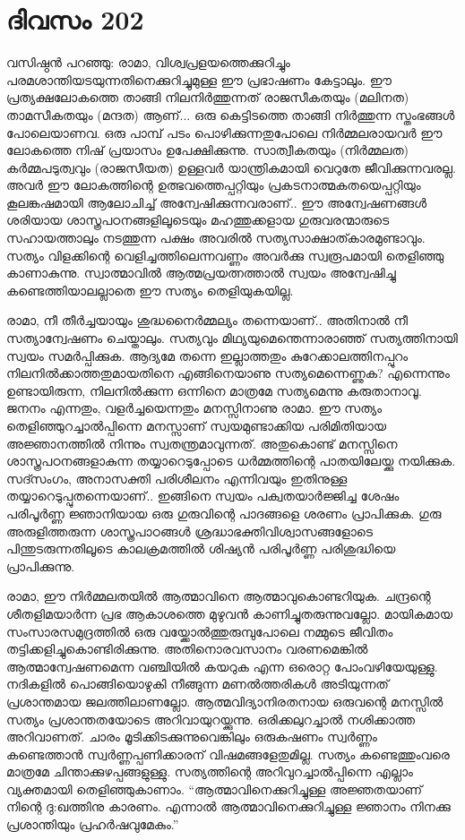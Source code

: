 \section{ദിവസം 202}


വസിഷ്ഠൻ പറഞ്ഞു: രാമാ, വിശ്വപ്രളയത്തെക്കുറിച്ചും പരമശാന്തിയടയുന്നതിനെക്കുറിച്ചുമുള്ള ഈ പ്രഭാഷണം കേട്ടാലും. ഈ പ്രത്യക്ഷലോകത്തെ താങ്ങി നിലനിർത്തുന്നത് രാജസീകതയും (മലിനത) താമസീകതയും (മന്ദത) ആണ്‌...  ഒരു കെട്ടിടത്തെ താങ്ങി നിർത്തുന്ന സ്തംഭങ്ങൾ പോലെയാണവ. ഒരു പാമ്പ് പടം പൊഴിക്കുന്നതുപോലെ നിർമ്മലരായവർ ഈ ലോകത്തെ നിഷ് പ്രയാസം  ഉപേക്ഷിക്കുന്നു. സാത്വീകതയും (നിർമ്മലത) കർമ്മപടുത്വവും (രാജസീയത) ഉള്ളവർ യാന്ത്രികമായി വെറുതേ ജീവിക്കുന്നവരല്ല. അവർ ഈ ലോകത്തിന്റെ ഉത്ഭവത്തെപ്പറ്റിയും പ്രകടനാത്മകതയെപ്പറ്റിയും കൂലങ്കഷമായി ആലോചിച്ച് അന്വേഷിക്കുന്നവരാണ്‌..  ഈ അന്വേഷണങ്ങൾ ശരിയായ ശാസ്ത്രപഠനങ്ങളിലൂടെയും മഹത്തുക്കളായ ഗുരുവരന്മാരുടെ സഹായത്താലും നടത്തുന്ന പക്ഷം അവരിൽ സത്യസാക്ഷാത്കാരമുണ്ടാവും. സത്യം വിളക്കിന്റെ വെളിച്ചത്തിലെന്നവണ്ണം അവർക്കു സ്വരൂപമായി തെളിഞ്ഞു കാണാകുന്നു. സ്വാത്മാവിൽ ആത്മപ്രയത്നത്താൽ സ്വയം അന്വേഷിച്ചു കണ്ടെത്തിയാലല്ലാതെ ഈ സത്യം തെളിയുകയില്ല.

രാമാ, നീ തീർച്ചയായും ശുദ്ധനൈർമ്മല്യം തന്നെയാണ്‌..  അതിനാൽ നീ സത്യാന്വേഷണം ചെയ്താലും. സത്യവും മിഥ്യയുമെന്തെന്നാരാഞ്ഞ് സത്യത്തിനായി സ്വയം സമർപ്പിക്കുക. ആദ്യമേ തന്നെ ഇല്ലാത്തതും കുറേക്കാലത്തിനപ്പുറം നിലനിൽക്കാത്തതുമായതിനെ എങ്ങിനെയാണു സത്യമെന്നെണ്ണുക? എന്നെന്നും ഉണ്ടായിരുന്ന, നിലനില്‍ക്കുന്ന ഒന്നിനെ മാത്രമേ സത്യമെന്നു കരുതാനാവൂ. ജനനം എന്നതും, വളർച്ചയെന്നതും മനസ്സിനാണു രാമാ. ഈ സത്യം തെളിഞ്ഞുറച്ചാല്‍പ്പിന്നെ മനസ്സാണ്‌ സ്വയമുണ്ടാക്കിയ പരിമിതിയായ അജ്ഞാനത്തിൽ നിന്നും സ്വതന്ത്രമാവുന്നത്. അതുകൊണ്ട് മനസ്സിനെ ശാസ്ത്രപഠനങ്ങളാകുന്ന തയ്യാറെടുപ്പോടെ  ധർമ്മത്തിന്റെ പാതയിലേയ്ക്കു നയിക്കുക. സദ്സംഗം, അനാസക്തി പരിശീലനം എന്നിവയും ഇതിനുള്ള തയ്യാറെടുപ്പുതന്നെയാണ്‌..  ഇങ്ങിനെ സ്വയം പക്വതയാർജ്ജിച്ച ശേഷം പരിപൂർണ്ണ ജ്ഞാനിയായ ഒരു ഗുരുവിന്റെ പാദങ്ങളെ ശരണം പ്രാപിക്കുക. ഗുരു അരുളിത്തരുന്ന ശാസ്ത്രപാഠങ്ങൾ ശ്രദ്ധാഭക്തിവിശ്വാസങ്ങളോടെ പിന്തുടരുന്നതിലൂടെ കാലക്രമത്തിൽ ശിഷ്യൻ പരിപൂർണ്ണ പരിശുദ്ധിയെ പ്രാപിക്കുന്നു.

രാമാ, ഈ നിർമ്മലതയിൽ ആത്മാവിനെ ആത്മാവുകൊണ്ടറിയുക. ചന്ദ്രന്റെ ശീതളിമയാര്‍ന്ന പ്രഭ  ആകാശത്തെ മുഴുവൻ കാണിച്ചുതരുന്നുവല്ലോ. മായികമായ സംസാരസമുദ്രത്തിൽ ഒരു വയ്ക്കോൽത്തുരുമ്പുപോലെ നമ്മുടെ ജീവിതം തട്ടിക്കളിച്ചുകൊണ്ടിരിക്കുന്നു. അതിനൊരവസാനം വരണമെങ്കിൽ ആത്മാന്വേഷണമെന്ന വഞ്ചിയിൽ കയറുക എന്ന ഒരൊറ്റ പോംവഴിയേയുള്ളു. നദികളിൽ പൊങ്ങിയൊഴുകി നീങ്ങുന്ന മണൽത്തരികൾ അടിയുന്നത് പ്രശാന്തമായ ജലത്തിലാണല്ലോ. ആത്മവിദ്യാനിരതനായ ഒരുവന്റെ മനസ്സിൽ സത്യം പ്രശാന്തതയോടെ അറിവായുറയ്ക്കുന്നു. ഒരിക്കലുറച്ചാൽ നശിക്കാത്ത അറിവാണത്. ചാരം മൂടിക്കിടക്കുന്നുവെങ്കിലും ഒരുകഷണം സ്വർണ്ണം കണ്ടെത്താൻ സ്വർണ്ണപ്പണിക്കാരന്‌ വിഷമങ്ങളേതുമില്ല. സത്യം കണ്ടെത്തുംവരെ മാത്രമേ ചിന്താക്കുഴപ്പങ്ങളുള്ളു. സത്യത്തിന്റെ അറിവുറച്ചാൽപ്പിന്നെ എല്ലാം വ്യക്തമായി തെളിഞ്ഞുകാണാം. “ആത്മാവിനെക്കുറിച്ചുള്ള അജ്ഞതയാണ്‌ നിന്റെ ദു:ഖത്തിനു കാരണം. എന്നാൽ ആത്മാവിനെക്കുറിച്ചുള്ള ജ്ഞാനം നിനക്കു പ്രശാന്തിയും പ്രഹർഷവുമേകും.” 

